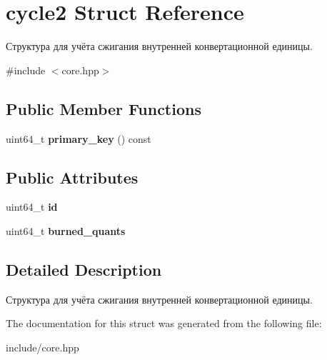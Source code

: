 \hypertarget{structcycle2}{}\section{cycle2 Struct Reference}
\label{structcycle2}


Структура для учёта сжигания внутренней конвертационной единицы.  




{\ttfamily \#include $<$core.\+hpp$>$}

\subsection*{Public Member Functions}
\begin{DoxyCompactItemize}
\item 
\mbox{\label{structcycle2_ab18ca4d07dd2081218c57cdc0b1a1d94}} 
uint64\+\_\+t {\bfseries primary\+\_\+key} () const
\end{DoxyCompactItemize}
\subsection*{Public Attributes}
\begin{DoxyCompactItemize}
\item 
\mbox{\label{structcycle2_a479711aca8cb20e3ddf9453d01e27ba3}} 
uint64\+\_\+t {\bfseries id}
\item 
\mbox{\label{structcycle2_a0ceb0bd15e83cbb00c43f5405d7ba73b}} 
uint64\+\_\+t {\bfseries burned\+\_\+quants}
\end{DoxyCompactItemize}


\subsection{Detailed Description}
Структура для учёта сжигания внутренней конвертационной единицы. 

The documentation for this struct was generated from the following file\+:\begin{DoxyCompactItemize}
\item 
include/core.\+hpp\end{DoxyCompactItemize}
